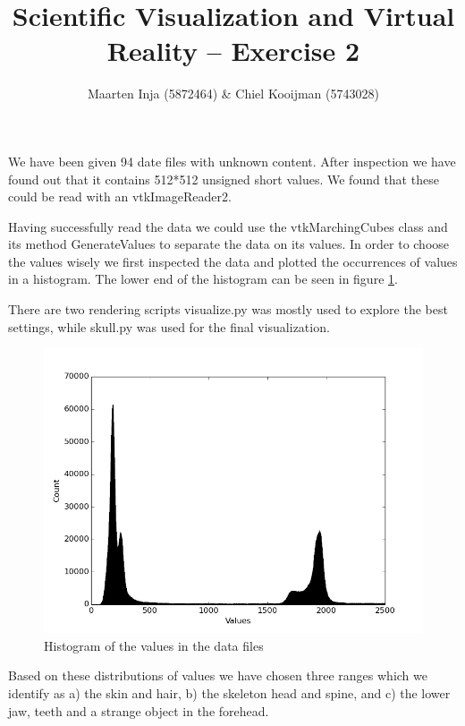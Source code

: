 \documentclass{article}[10pt]
\title{Scientific Visualization and Virtual Reality – Exercise 2}
\author{Maarten Inja (5872464) \& Chiel Kooijman (5743028)}
\begin{document}
\maketitle

\noindent
We have been given 94 date files with unknown content. After inspection we have
found out that it contains 512*512 unsigned short values. We found that these
could be read with an \textsf{vtkImageReader2}.

Having successfully read the data we could use the \textsf{vtkMarchingCubes}
class and its method \textsf{GenerateValues} to separate the data on its
values. In order to choose the values wisely we first inspected the data and
plotted the occurrences of values in a histogram. The lower end of the
histogram can be seen in figure \ref{fig:histLow}.

There are two rendering scripts \textsf{visualize.py} was mostly used to
explore the best settings, while \textsf{skull.py} was used for the final
visualization.

\begin{figure}[h]
\centering
\includegraphics[width=\textwidth]{hist}
\caption{Histogram of the values in the data files}
\label{fig:histLow}
\end{figure}

Based on these distributions of values we have chosen three ranges which we
identify as a) the skin and hair, b) the skeleton head and spine, and c) the
lower jaw, teeth and a strange object in the forehead.
\end{document}
